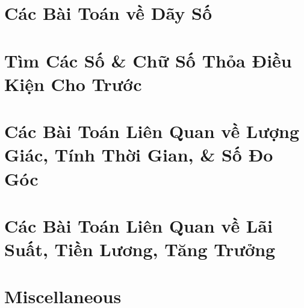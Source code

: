 \documentclass{article}
\begin{document}
\section{Các Bài Toán về Dãy Số}


\section{Tìm Các Số \& Chữ Số Thỏa Điều Kiện Cho Trước}


\section{Các Bài Toán Liên Quan về Lượng Giác, Tính Thời Gian, \& Số Đo Góc}


\section{Các Bài Toán Liên Quan về Lãi Suất, Tiền Lương, Tăng Trưởng}


\section{Miscellaneous}


\printbibliography[heading=bibintoc]
	
\end{document}
